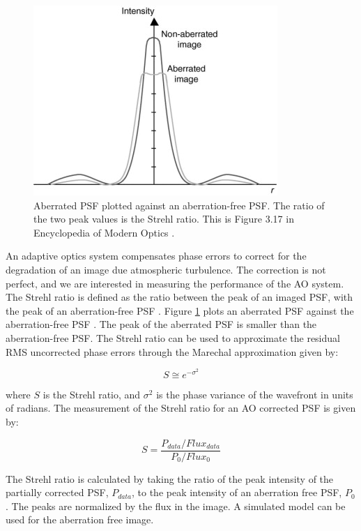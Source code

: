 \begin{figure}
    \centering
    \includegraphics{Chapter Materials/Chapter One Materials/StrehlRatio.png}
    \caption{Aberrated PSF plotted against an aberration-free PSF. The ratio of the two peak values is the Strehl ratio. This is Figure 3.17 in Encyclopedia of Modern Optics \citep{guenther2018encyclopedia}.}
    \label{fig:SR}
\end{figure}

An adaptive optics system compensates phase errors to correct for the degradation of an image due atmospheric turbulence. The correction is not perfect, and we are interested in measuring the performance of the AO system. The Strehl ratio is defined as the ratio between the peak of an imaged PSF, with the peak of an aberration-free PSF \citep{reine2005encyclopedia}. Figure \ref{fig:SR} plots an aberrated PSF against the aberration-free PSF \citep{guenther2018encyclopedia}. The peak of the aberrated PSF is smaller than the aberration-free PSF. The Strehl ratio can be used to approximate the residual RMS uncorrected phase errors through the Marechal approximation given by:

\begin{equation}
    S \cong e^{-\sigma^2}
    \label{Marechal}
\end{equation}

\noindent where $S$ is the Strehl ratio, and $\sigma^2$ is the phase variance of the wavefront in units of radians. The measurement of the Strehl ratio for an AO corrected PSF is given by:

\begin{equation}
    S=\frac{P_{data}/Flux_{data}}{P_{0}/Flux_{0}}
    \label{Strehl}
\end{equation}


\noindent The Strehl ratio is calculated by taking the ratio of the peak intensity of the partially corrected PSF, $P_{data}$,  to the peak intensity of an aberration free PSF, $P_0$. The peaks are normalized by the flux in the image. A simulated model can be used for the aberration free image. 

